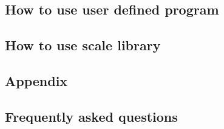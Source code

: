 \documentclass[a4paper]{report}
\begin{document}
 \chapter{How to use user defined program}
 \chapter{How to use scale library}
 
 




\begin{appendix}
\part{Appendix}
\chapter{Frequently asked questions} \label{achap:practice}


\end{appendix}


\ClearWallPaper

\end{document}
